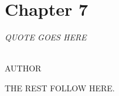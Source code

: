 \chapter{Chapter 7}\label{chp:chp7}

\begin{flushright}
  {\em QUOTE GOES HERE }\\

\ \

\normalsize
{AUTHOR}  
\end{flushright}



THE REST FOLLOW HERE. 


